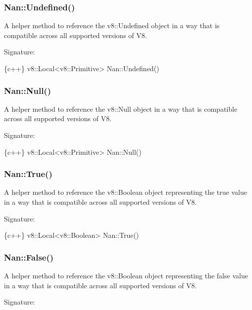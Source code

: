 \label{_api_nan_undefined}%
 \subsubsection*{Nan\+::\+Undefined()}

A helper method to reference the {\ttfamily v8\+::\+Undefined} object in a way that is compatible across all supported versions of V8.

Signature\+:


\begin{DoxyCode}
\{c++\}
v8::Local<v8::Primitive> Nan::Undefined()
\end{DoxyCode}


\label{_api_nan_null}%
 \subsubsection*{Nan\+::\+Null()}

A helper method to reference the {\ttfamily v8\+::\+Null} object in a way that is compatible across all supported versions of V8.

Signature\+:


\begin{DoxyCode}
\{c++\}
v8::Local<v8::Primitive> Nan::Null()
\end{DoxyCode}


\label{_api_nan_true}%
 \subsubsection*{Nan\+::\+True()}

A helper method to reference the {\ttfamily v8\+::\+Boolean} object representing the {\ttfamily true} value in a way that is compatible across all supported versions of V8.

Signature\+:


\begin{DoxyCode}
\{c++\}
v8::Local<v8::Boolean> Nan::True()
\end{DoxyCode}


\label{_api_nan_false}%
 \subsubsection*{Nan\+::\+False()}

A helper method to reference the {\ttfamily v8\+::\+Boolean} object representing the {\ttfamily false} value in a way that is compatible across all supported versions of V8.

Signature\+:


